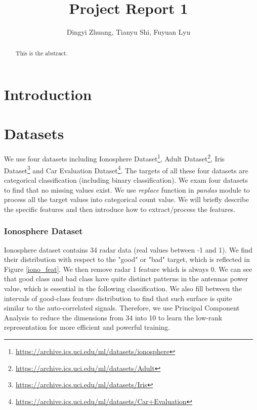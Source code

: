 \documentclass[11pt]{scrartcl}
\title{Project Report 1}
\author{Dingyi Zhuang, Tianyu Shi, Fuyuan Lyu}
\begin{document}
\maketitle

\begin{abstract}
This is the abstract.
\end{abstract}

\section{Introduction}

\section{Datasets}
We use four datasets including Ionosphere Dataset\footnote{\url{https://archive.ics.uci.edu/ml/datasets/ionosphere}}, Adult Dataset\footnote{\url{https://archive.ics.uci.edu/ml/datasets/Adult}}, Iris Dataset\footnote{\url{https://archive.ics.uci.edu/ml/datasets/Iris}} and Car Evaluation Dataset\footnote{\url{https://archive.ics.uci.edu/ml/datasets/Car+Evaluation}}. The targets of all these four datasets are categorical classification (including binary classification). We exam four datasets to find that no missing values exist. We use \textit{replace} function in \textit{pandas} module to process all the target values into categorical count value. We will briefly describe the specific features and then introduce how to extract/process the features.

\subsubsection*{Ionosphere Dataset}
Ionosphere dataset contains 34 radar data (real values between -1 and 1)\cite{sigillito1989classification}. We find their distribution with respect to the "good" or "bad" target, which is reflected in Figure \ref{iono_feat}. We then remove radar 1 feature which is always 0. We can see that good class and bad class have quite distinct patterns in the antennas power value, which is essential in the following classification. We also fill between the intervals of good-class feature distribution to find that such surface is quite similar to the auto-correlated signals. Therefore, we use Principal Component Analysis to reduce the dimensions from 34 into 10 to learn the low-rank representation for more efficient and powerful training.
\end{document}
